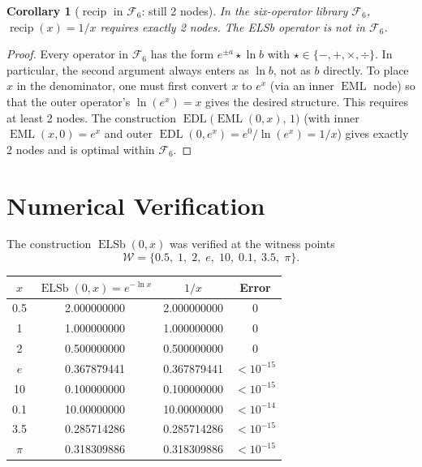 \documentclass[12pt,a4paper]{article}
\newtheorem{corollary}[theorem]{Corollary}
\theoremstyle{definition}
\newcommand{\EML}{\operatorname{EML}}
\newcommand{\EDL}{\operatorname{EDL}}
\newcommand{\ELSb}{\operatorname{ELSb}}
\newcommand{\recip}{\operatorname{recip}}
\begin{document}
\begin{corollary}[$\recip$ in $\mathcal{F}_6$: still 2 nodes]
\label{cor:F6}
In the six-operator library $\mathcal{F}_6$, $\recip(x) = 1/x$ requires
exactly 2 nodes.  The ELSb operator is not in $\mathcal{F}_6$.
\end{corollary}

\begin{proof}
Every operator in $\mathcal{F}_6$ has the form $e^{\pm a} \star \ln b$
with $\star \in \{-, +, \times, \div\}$.  In particular, the second argument
always enters as $\ln b$, not as $b$ directly.  To place $x$ in the
denominator, one must first convert $x$ to $e^x$ (via an inner $\EML$ node)
so that the outer operator's $\ln(e^x) = x$ gives the desired structure.
This requires at least 2 nodes.  The construction
$\EDL\bigl(\EML(0,x),\,1\bigr)$ (with inner $\EML(x,0) = e^x$ and outer
$\EDL(0, e^x) = e^0/\ln(e^x) = 1/x$) gives exactly 2 nodes and is optimal
within $\mathcal{F}_6$.
\end{proof}

\section{Numerical Verification}

The construction $\ELSb(0, x)$ was verified at the witness points
\[
  \mathcal{W} = \{0.5,\;1,\;2,\;e,\;10,\;0.1,\;3.5,\;\pi\}.
\]

\begin{center}
\begin{tabular}{@{}cccc@{}}
\toprule
$x$ & $\ELSb(0,x) = e^{-\ln x}$ & $1/x$ & Error \\
\midrule
0.5   & 2.000000000 & 2.000000000 & 0 \\
1     & 1.000000000 & 1.000000000 & 0 \\
2     & 0.500000000 & 0.500000000 & 0 \\
$e$   & 0.367879441 & 0.367879441 & $< 10^{-15}$ \\
10    & 0.100000000 & 0.100000000 & $< 10^{-15}$ \\
0.1   & 10.00000000 & 10.00000000 & $< 10^{-14}$ \\
3.5   & 0.285714286 & 0.285714286 & $< 10^{-15}$ \\
$\pi$ & 0.318309886 & 0.318309886 & $< 10^{-15}$ \\
\bottomrule
\end{tabular}
\end{center}
\end{document}
